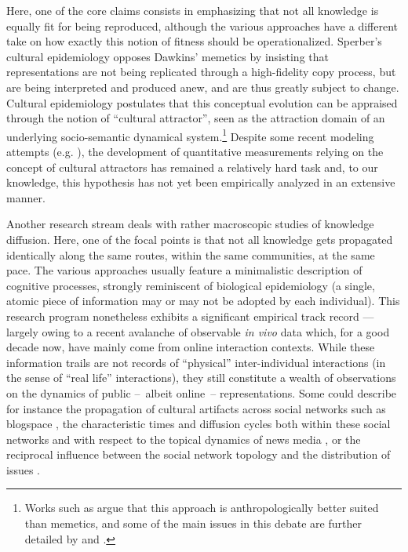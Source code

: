 Here, one of the core claims consists in emphasizing that not all knowledge is equally fit for being reproduced, although the various approaches have a different take on how exactly this notion of fitness should be operationalized. Sperber's cultural epidemiology opposes Dawkins' memetics by insisting that representations are not being replicated through a high-fidelity copy process, but are being interpreted and produced anew, and are thus greatly subject to change.
Cultural epidemiology postulates that this conceptual evolution can be appraised through the notion of ``cultural attractor'', seen as the attraction domain of an underlying socio-semantic dynamical system.\footnote{Works such as \citet{Atran03} argue that this approach is anthropologically better suited than memetics, and some of the main issues in this debate are further detailed by \citet{Kuper00} and \citet{Bloch00}.}
Despite some recent modeling attempts (\hbox{e.g.} \citet{Claidiere07}), the development of quantitative measurements relying on the concept of cultural attractors has remained a relatively hard task and, to our knowledge, this hypothesis has not yet been empirically analyzed in an extensive manner.


Another research stream deals with rather macroscopic studies of knowledge diffusion. Here, one of the focal points is that not all knowledge gets propagated identically along the same routes, within the same communities, at the same pace. The various approaches usually feature a minimalistic description of cognitive processes, strongly reminiscent of biological epidemiology (a single, atomic piece of information may or may not be adopted by each individual).  
This research program nonetheless exhibits a significant empirical track record --- largely owing to a recent avalanche of observable \emph{in vivo} data which, for a good decade now, have mainly come from online interaction contexts.
While these information trails are not records of ``physical'' inter-individual interactions (in the sense of ``real life'' interactions), they still constitute a wealth of observations on the dynamics of public --~albeit online~-- representations.
Some could describe for instance the propagation of cultural artifacts across social networks such as blogspace \citep{Gruhl04}, the characteristic times and diffusion cycles both within these social networks and with respect to the topical dynamics of news media \citep{Leskovec09}, or the reciprocal influence between the social network topology and the distribution of issues \citep{Cointet09}.

